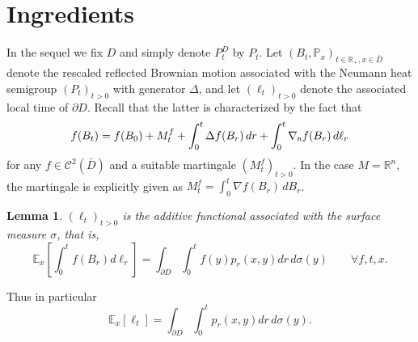 \documentclass[a4paper,12pt]{article}
\theoremstyle{plain}
\newtheorem{lemma}[thm]{Lemma}
\def\R{{\mathbb R}}
\def\R{{\mathbb R}}%
\begin{document}
\section{Ingredients}
In the sequel we fix $D$ and simply denote $P^D_t$ by $P_t$.
Let $(B_t,\mathbb P_x)_{t\in\R_+, x\in \bar D}$ denote the rescaled reflected Brownian motion associated with the Neumann heat semigroup $(P_t)_{t>0}$ with generator  $\Delta$, and let $(\ell_t)_{t>0}$ denote the associated local time of $\partial D$.
Recall that the latter is characterized by the fact that
\begin{equation}\label{ito}
f(B_t)=f(B_0)+ M^f_t+\int_0^t \Delta f(B_r)\,dr + \int_0^t \nabla_{\sf n} f(B_r)\,d\ell_r\end{equation}
for any $f\in \mathcal C^2(\bar D)$ and a suitable martingale $(M^f_t)_{t>0}$. In the case $M=\R^n$, the martingale is explicitly given as $M^f_t=\int_0^t \nabla f(B_r)\,dB_r$.

\begin{lemma}\label{l3}
 $(\ell_t)_{t>0}$  is the additive functional associated with the surface measure $\sigma$, that is,
\begin{equation}\label{pcaf} \mathbb E_x\left[\int_0^tf(B_r)d\ell_r\right]=\int_{\partial D}\int_0^t f(y) p_r(x,y)dr\,d\sigma(y) \qquad \forall f, t, x.
\end{equation}
\end{lemma}
Thus in particular
\begin{equation*}\mathbb E_x[\ell_t]=\int_{\partial D}\int_0^t p_r(x,y)dr\,d\sigma(y).\end{equation*}
\end{document}
